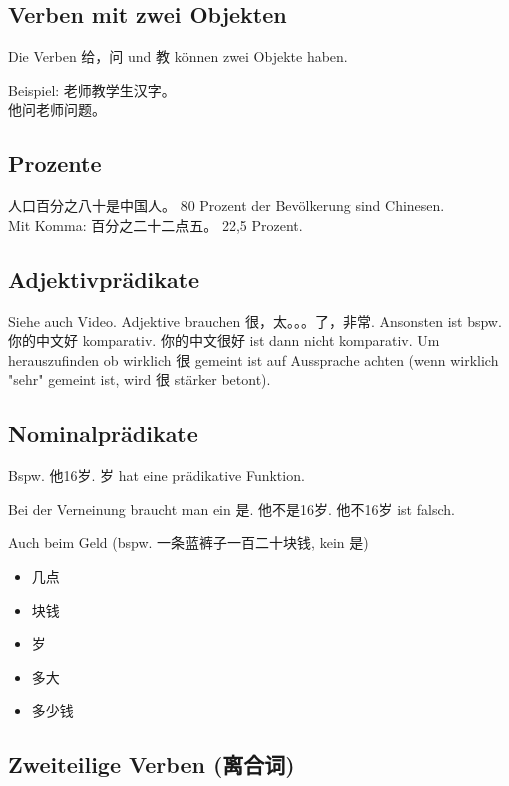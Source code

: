 \documentclass[UTF8]{ctexart}
\begin{document}
\subsection{Verben mit zwei Objekten}

Die Verben 给，问 und 教 können zwei Objekte haben.

Beispiel: 老师教学生汉字。\\
他问老师问题。

\subsection{Prozente}

人口百分之八十是中国人。 80 Prozent der Bevölkerung sind Chinesen.\\
Mit Komma: 百分之二十二点五。 22,5 Prozent.

\subsection{Adjektivprädikate}

Siehe auch Video. Adjektive brauchen 很，太。。。了，非常. Ansonsten ist bspw. 你的中文好 komparativ. 你的中文很好 ist dann nicht komparativ. Um herauszufinden ob wirklich 很 gemeint ist auf Aussprache achten (wenn wirklich "sehr" gemeint ist, wird 很 stärker betont).

\subsection{Nominalprädikate}

Bspw. 他16岁. 岁 hat eine prädikative Funktion.

Bei der Verneinung braucht man ein 是. 他不是16岁. 他不16岁 ist falsch.

Auch beim Geld (bspw. 一条蓝裤子一百二十块钱, kein 是)

\begin{itemize}
    \item 几点
    \item 块钱
    \item 岁
    \item 多大
    \item 多少钱
\end{itemize}

\subsection{Zweiteilige Verben (离合词)}
\end{document}
